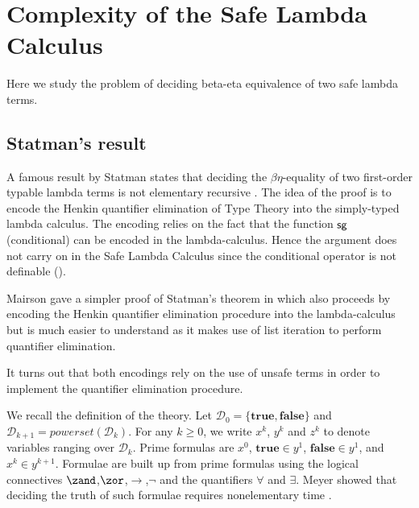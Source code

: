 \newcommand\bigo{\mathcal{O}} %
\newcommand\booltype{\mathbf{B}}

\section{Complexity of the Safe Lambda Calculus}
Here we study the problem of deciding beta-eta equivalence of two safe lambda terms.

\subsection{Statman's result}

A famous result by Statman  states that deciding the $\beta\eta$-equality of two first-order typable lambda terms is not elementary recursive \cite{Statman:1979:TLE}.
The idea of the proof is to encode the Henkin quantifier elimination of Type Theory into the simply-typed lambda calculus. The encoding relies on the fact that the function $\sf sg$ (conditional) can be encoded in the lambda-calculus. Hence the argument does not carry on   in the Safe Lambda Calculus since the conditional operator is not definable (\cite{blumong:safelambdacalculus}).

Mairson gave a simpler proof of Statman's theorem in \cite{mairson1992spt} which also proceeds by encoding the Henkin quantifier elimination procedure into the lambda-calculus but is much easier to understand as it makes use of list iteration to perform quantifier elimination.

It turns out that both encodings rely on the use of unsafe terms in order to implement the quantifier elimination procedure.


We recall the definition of the theory. Let $\mathcal{D}_0 = \{\mathbf{true},\mathbf{false}\}$ and $\mathcal{D}_{k+1} =powerset(\mathcal{D}_k)$.
For any $k\geq0$, we write $x^k$, $y^k$ and $z^k$ to denote variables ranging over $\mathcal{D}_k$. Prime formulas are $x^0$, $\mathbf{true}\in y^1$, $\mathbf{false}\in y^1$, and  $x^k \in y^{k+1}$. Formulae are built up from prime formulas using the logical connectives $\zand$,$\zor$,$\rightarrow$,$\neg$ and the quantifiers
$\forall$ and $\exists$. Meyer showed that deciding the truth of such formulae requires nonelementary time \cite{Meyer1974}.
\smallskip


